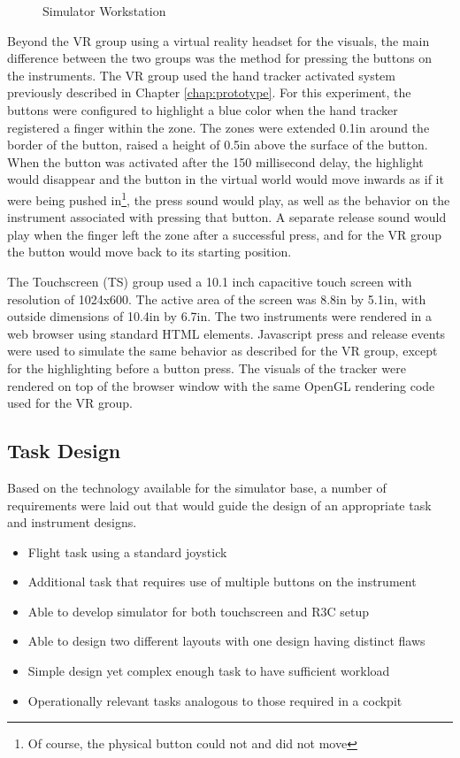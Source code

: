 \begin{figure}
    \caption{Simulator Workstation}
    \label{fig:de_simgroups}
\end{figure}

Beyond the VR group using a virtual reality headset for the visuals, the main difference between the two groups was the method for pressing the buttons on the instruments.
The VR group used the hand tracker activated system previously described in Chapter \autoref{chap:prototype}.
For this experiment, the buttons were configured to highlight a blue color when the hand tracker registered a finger within the zone.
The zones were extended 0.1in around the border of the button, raised a height of 0.5in above the surface of the button.
When the button was activated after the 150 millisecond delay, the highlight would disappear and the button in the virtual world would move inwards as if it were being pushed in\footnote{Of course, the physical button could not and did not move}, the press sound would play, as well as the behavior on the instrument associated with pressing that button.
A separate release sound would play when the finger left the zone after a successful press, and for the VR group the button would move back to its starting position.

The Touchscreen (TS) group used a 10.1 inch capacitive touch screen with resolution of 1024x600.
The active area of the screen was 8.8in by 5.1in, with outside dimensions of 10.4in by 6.7in.
The two instruments were rendered in a web browser using standard HTML elements.
Javascript press and release events were used to simulate the same behavior as described for the VR group, except for the highlighting before a button press.
The visuals of the tracker were rendered on top of the browser window with the same OpenGL rendering code used for the VR group.


\subsection{Task Design}

Based on the technology available for the simulator base, a number of requirements were laid out that would guide the design of an appropriate task and instrument designs.

\begin{itemize}
    \item Flight task using a standard joystick
    \item Additional task that requires use of multiple buttons on the instrument
    \item Able to develop simulator for both touchscreen and R3C setup 
    \item Able to design two different layouts with one design having distinct flaws
    \item Simple design yet complex enough task to have sufficient workload
    \item Operationally relevant tasks analogous to those required in a cockpit
\end{itemize}

